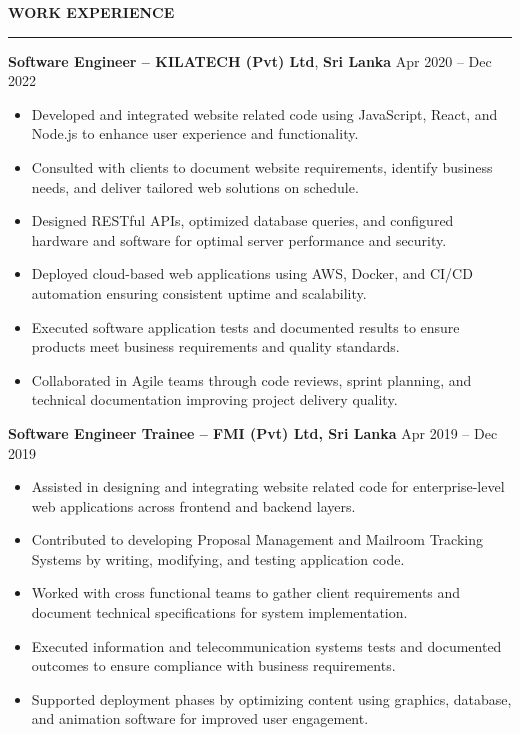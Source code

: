 \documentclass[10pt,letterpaper]{article}
\begin{document}
\vspace{8pt}

\textbf{WORK EXPERIENCE}\\[-8pt]
\noindent\rule{\textwidth}{1pt}

\vspace{-2pt}

\textbf{Software Engineer -- KILATECH (Pvt) Ltd}, \textbf{Sri Lanka} \hfill Apr 2020 -- Dec 2022

\vspace{-1pt}

\begin{itemize}
\item Developed and integrated website related code using JavaScript, React, and Node.js to enhance user experience and functionality.
\item Consulted with clients to document website requirements, identify business needs, and deliver tailored web solutions on schedule.
\item Designed RESTful APIs, optimized database queries, and configured hardware and software for optimal server performance and security.
\item Deployed cloud-based web applications using AWS, Docker, and CI/CD automation ensuring consistent uptime and scalability.
\item Executed software application tests and documented results to ensure products meet business requirements and quality standards.
\item Collaborated in Agile teams through code reviews, sprint planning, and technical documentation improving project delivery quality.
\end{itemize}

\textbf{Software Engineer Trainee -- FMI (Pvt) Ltd, Sri Lanka} \hfill Apr 2019 -- Dec 2019

\vspace{-1pt}

\begin{itemize}
\item Assisted in designing and integrating website related code for enterprise-level web applications across frontend and backend layers.
\item Contributed to developing Proposal Management and Mailroom Tracking Systems by writing, modifying, and testing application code.
\item Worked with cross functional teams to gather client requirements and document technical specifications for system implementation.
\item Executed information and telecommunication systems tests and documented outcomes to ensure compliance with business requirements.
\item Supported deployment phases by optimizing content using graphics, database, and animation software for improved user engagement.
\end{itemize}
\end{document}
